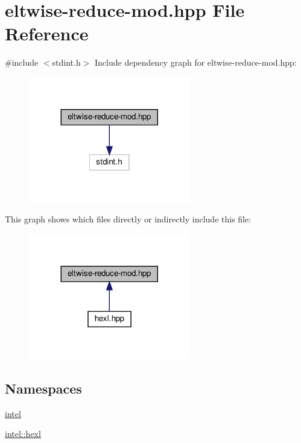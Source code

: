 \hypertarget{eltwise-reduce-mod_8hpp}{}\section{eltwise-\/reduce-\/mod.hpp File Reference}
\label{eltwise-reduce-mod_8hpp}
{\ttfamily \#include $<$stdint.\+h$>$}\newline
Include dependency graph for eltwise-\/reduce-\/mod.hpp\+:
\nopagebreak
\begin{figure}[H]
\begin{center}
\leavevmode
\includegraphics[width=200pt]{eltwise-reduce-mod_8hpp__incl}
\end{center}
\end{figure}
This graph shows which files directly or indirectly include this file\+:
\nopagebreak
\begin{figure}[H]
\begin{center}
\leavevmode
\includegraphics[width=200pt]{eltwise-reduce-mod_8hpp__dep__incl}
\end{center}
\end{figure}
\subsection*{Namespaces}
\begin{DoxyCompactItemize}
\item 
 \hyperlink{namespaceintel}{intel}
\item 
 \hyperlink{namespaceintel_1_1hexl}{intel\+::hexl}
\end{DoxyCompactItemize}
